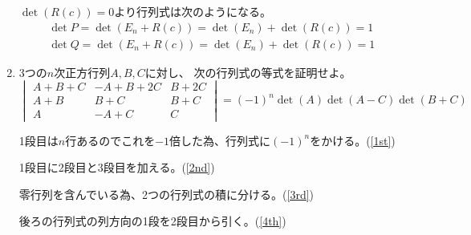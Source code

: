 \documentclass[12pt,b5paper]{ltjsarticle}
\begin{document}
\begin{enumerate}
      $\det(R(c))=0$より行列式は次のようになる。
      \begin{align}
       \det P = \det(E_n + R(c)) = \det(E_n) + \det(R(c)) =1\\
       \det Q = \det(E_n + R(c)) = \det(E_n) + \det(R(c)) =1
      \end{align}

      \hrulefill

 \item
      3つの$n$次正方行列$A,B,C$に対し、
      次の行列式の等式を証明せよ。
      \begin{equation}
       \begin{vmatrix}
        A+B+C & -A+B+2C & B+2C\\
        A+B & B+C & B+C\\
        A & -A+C & C
       \end{vmatrix}
       =
       (-1)^n \det(A) \det(A-C) \det(B+C)
      \end{equation}

      \dotfill

      1段目は$n$行あるのでこれを$-1$倍した為、行列式に$(-1)^n$をかける。(\ref{1st})

      1段目に2段目と3段目を加える。(\ref{2nd})

      零行列を含んでいる為、2つの行列式の積に分ける。(\ref{3rd})

      後ろの行列式の列方向の1段を2段目から引く。(\ref{4th})


\end{enumerate}
\end{document}
